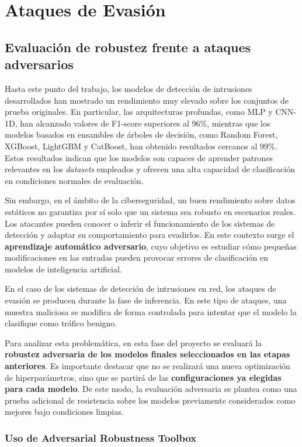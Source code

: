 \chapter{Ataques de Evasión}
\section{Evaluación de robustez frente a ataques adversarios}

Hasta este punto del trabajo, los modelos de detección de intrusiones desarrollados han mostrado un rendimiento muy elevado sobre los conjuntos de prueba originales. En particular, las arquitecturas profundas, como MLP y CNN-1D, han alcanzado valores de F1-score superiores al 96\%, mientras que los modelos basados en ensambles de árboles de decisión, como Random Forest, XGBoost, LightGBM y CatBoost, han obtenido resultados cercanos al 99\%. Estos resultados indican que los modelos son capaces de aprender patrones relevantes en los \textit{datasets} empleados y ofrecen una alta capacidad de clasificación en condiciones normales de evaluación.
 
Sin embargo, en el ámbito de la ciberseguridad, un buen rendimiento sobre datos estáticos no garantiza por sí solo que un sistema sea robusto en escenarios reales. Los atacantes pueden conocer o inferir el funcionamiento de los sistemas de detección y adaptar su comportamiento para evadirlos. En este contexto surge el \textbf{aprendizaje automático adversario}, cuyo objetivo es estudiar cómo pequeñas modificaciones en las entradas pueden provocar errores de clasificación en modelos de inteligencia artificial.

En el caso de los sistemas de detección de intrusiones en red, los ataques de evasión se producen durante la fase de inferencia. En este tipo de ataques, una muestra maliciosa se modifica de forma controlada para intentar que el modelo la clasifique como tráfico benigno.

Para analizar esta problemática, en esta fase del proyecto se evaluará la \textbf{robustez adversaria de los modelos finales seleccionados en las etapas anteriores}. Es importante destacar que no se realizará una nueva optimización de hiperparámetros, sino que se partirá de las \textbf{configuraciones ya elegidas para cada modelo}. De este modo, la evaluación adversaria se plantea como una prueba adicional de resistencia sobre los modelos previamente considerados como mejores bajo condiciones limpias.

\subsection{Uso de Adversarial Robustness Toolbox}

